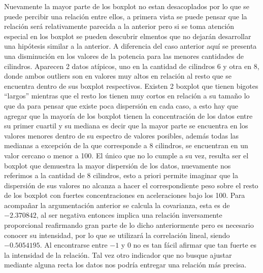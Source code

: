 \documentclass[letter,10pt]{article}
\begin{document}
Nuevamente la mayor parte de los boxplot no estan desacoplados por lo que se puede percibir una relación entre ellos, a primera
vista se puede pensar que la relación será relativamente parecida a la anterior pero si se toma atención especial en los boxplot se pueden
descubrir elmentos que no dejarán desarrollar una hipótesis similar a la anterior.
A diferencia del caso anterior aquí se presenta una disminución en los valores de la potencia para las menores cantidades de cilindros.
Aparecen 2 datos atípicos, uno en la cantidad de cilindros 6 y otra en 8, donde ambos outliers son 
en valores muy altos en relación al resto que se encuentra
dentro de sus boxplot respectivos. Existen 2 boxplot que tienen bigotes ``largos'' mientras que el resto los tienen
 muy cortos en relación a su tamaño lo que da para pensar que existe poca dispersión en cada caso, 
 a esto hay que agregar que la mayoría de los boxplot tienen la concentración de los datos entre su primer cuartil y su mediana
 es decir que la mayor parte se encuentra en los valores menores dentro de su espectro de valores posibles, 
 además todas las medianas a excepción de la que corresponde a 8 cilindros, se encuentran en un valor cercano o menor a 100.
 El único que no lo cumple a su vez, resulta ser el boxplot que demuestra la mayor dispersión de los datos, nuevamente
 nos referimos a la cantidad de 8 cilindros, esto a priori permite imaginar que la dispersión de sus valores 
 no alcanza a hacer el correspondiente peso sobre el resto de los boxplot con fuertes concentraciones en 
 aceleraciones bajo los 100.
 Para acompañar la argumentación anterior se calcula la covarianza, esta es de $-2.370842$, al ser negativa entonces
 implica una relación inversamente proporcional 
 reafirmando gran parte de lo dicho anteriormente pero es necesario conocer su intensidad, por lo que se utilizará 
 la correlación lineal, siendo $-0.5054195$. Al encontrarse entre $-1$ y $0$ no es tan fácil afirmar que
 tan fuerte es la intensidad de la relación. Tal vez otro indicador que no busque ajustar mediante alguna recta los datos nos
 podría entregar una relación más precisa.
 


\newpage
\end{document}
